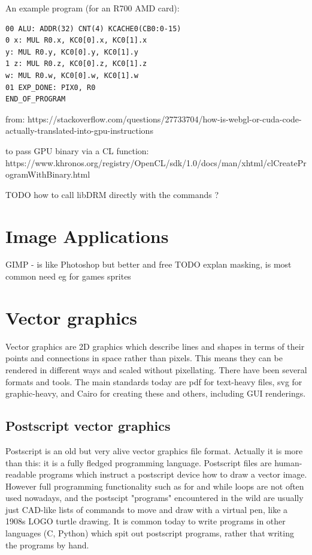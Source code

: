 \documentclass[oneside,english]{scrbook}
\begin{document}
An example program (for an R700 AMD card):

\begin{lstlisting}
00 ALU: ADDR(32) CNT(4) KCACHE0(CB0:0-15)   
0 x: MUL R0.x, KC0[0].x, KC0[1].x    
y: MUL R0.y, KC0[0].y, KC0[1].y
1 z: MUL R0.z, KC0[0].z, KC0[1].z
w: MUL R0.w, KC0[0].w, KC0[1].w
01 EXP_DONE: PIX0, R0
END_OF_PROGRAM
\end{lstlisting}

from:
https://stackoverflow.com/questions/27733704/how-is-webgl-or-cuda-code-actually-translated-into-gpu-instructions

to pass GPU binary via a CL function:
https://www.khronos.org/registry/OpenCL/sdk/1.0/docs/man/xhtml/clCreateProgramWithBinary.html

TODO how to call libDRM directly with the commands ?


\chapter{Image Applications}
GIMP - is like Photoshop but better and free
TODO explan masking, is most common need eg for games sprites




\chapter{Vector graphics}

Vector graphics are 2D graphics which describe lines and shapes in terms of their points and connections in space rather than pixels. This means they can be rendered in different ways and scaled without pixellating.  There have been several formats and tools. The main standards today are pdf for text-heavy files, svg for graphic-heavy, and Cairo for creating these and others, including GUI renderings.

\section{Postscript vector graphics}

Postscript is an old but very alive vector graphics file format. Actually it is more than this: it is a fully fledged programming language.   Postscript files are human-readable programs which instruct a postscript device how to draw a vector image.  However full programming functionality such as for and while loops are not often used nowadays, and the postscipt "programs" encountered in the wild are usually just CAD-like lists of commands to move and draw with a virtual pen, like a 1908s LOGO turtle drawing.  It is common today to write programs in other languages (C, Python) which spit out postscript programs, rather that writing the programs by hand.
\end{document}
